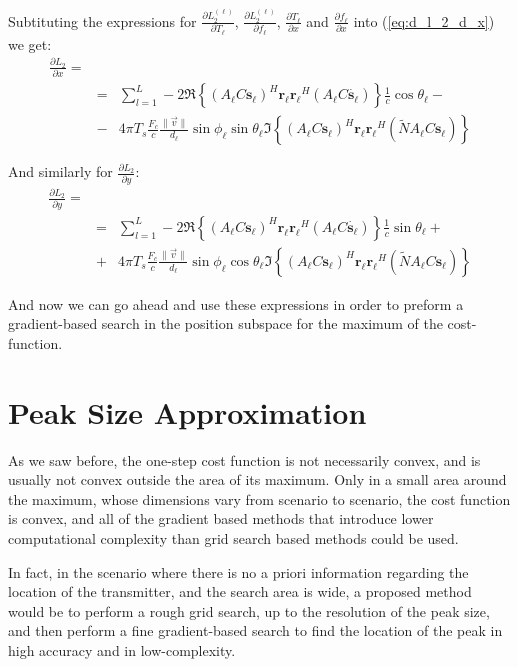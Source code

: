 Subtituting the expressions for $\frac{\partial L_2^{(\ell)}}{\partial T_\ell}$, $\frac{\partial L_2^{(\ell)}}{\partial f_\ell}$, $\frac{\partial T_\ell}{\partial x}$ and $\frac{\partial f_\ell}{\partial x}$ into (\ref{eq:d_l_2_d_x}) we get:
\begin{eqnarray}
\frac{\partial L_2}{\partial x} = \\
&=& \sum_{l=1}^L -2 \Re \left\{ (A_\ell C \mathbf{s_\ell})^H \mathbf{r_\ell} \mathbf{r_\ell}^H (A_\ell C \mathbf{\dot{s_\ell}})\right\}\frac{1}{c}\cos\theta_\ell - \nonumber \\
&-& 4\pi T_s \frac{F_c}{c} \frac{\|\vec{v}\|}{d_\ell} \sin \phi_\ell \sin \theta_\ell \Im \left\{ (A_\ell C  \mathbf{s_\ell})^H \mathbf{r_\ell} \mathbf{r_\ell}^H (\tilde{N} A_\ell C \mathbf{s_\ell})\right\} \nonumber
\end{eqnarray}

And similarly for $\frac{\partial L_2}{\partial y}$:
\begin{eqnarray}
\frac{\partial L_2}{\partial y} = \\
&=& \sum_{l=1}^L -2 \Re \left\{ (A_\ell C \mathbf{s_\ell})^H \mathbf{r_\ell} \mathbf{r_\ell}^H (A_\ell C \mathbf{\dot{s_\ell}})\right\}\frac{1}{c}\sin\theta_\ell + \nonumber \\
&+& 4\pi T_s \frac{F_c}{c} \frac{\|\vec{v}\|}{d_\ell} \sin \phi_\ell \cos \theta_\ell \Im \left\{ (A_\ell C  \mathbf{s_\ell})^H \mathbf{r_\ell} \mathbf{r_\ell}^H (\tilde{N} A_\ell C \mathbf{s_\ell})\right\} \nonumber
\end{eqnarray}

And now we can go ahead and use these expressions in order to preform a gradient-based search in the position subspace for the maximum of the cost-function.

\section{Peak Size Approximation}
As we saw before, the one-step cost function is not necessarily convex, and is usually not convex outside the area of its maximum. Only in a small area around the maximum, whose dimensions vary from scenario to scenario, the cost function is convex, and all of the gradient based methods that introduce lower computational complexity than grid search based methods could be used. 

In fact, in the scenario where there is no a priori information regarding the location of the transmitter, and the search area is wide, a proposed method would be to perform a rough grid search, up to the resolution of the peak size, and then perform a fine gradient-based search to find the location of the peak in high accuracy and in low-complexity.

